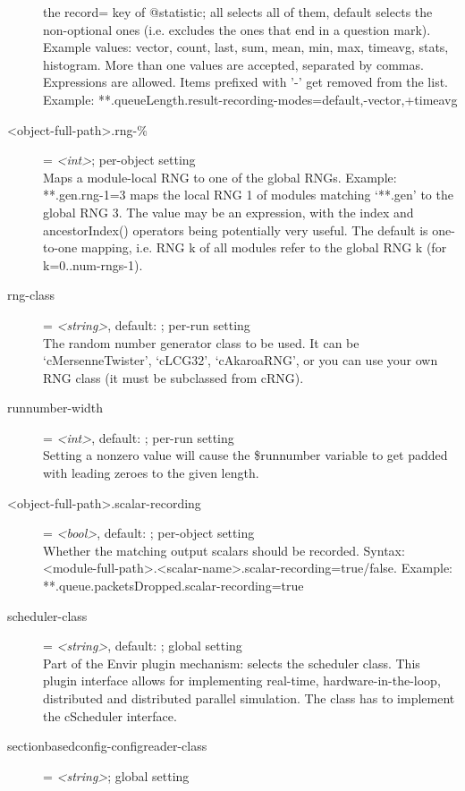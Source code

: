 \begin{description}
    the record= key of @statistic; all selects all of them, default selects the
    non-optional ones (i.e. excludes the ones that end in a question mark).
    Example values: vector, count, last, sum, mean, min, max, timeavg, stats,
    histogram. More than one values are accepted, separated by commas.
    Expressions are allowed. Items prefixed with '-' get removed from the list.
    Example: **.queueLength.result-recording-modes=default,-vector,+timeavg
\item[<object-full-path>.rng-\%] = \textit{<int>}; per-object setting \\
    Maps a module-local RNG to one of the global RNGs. Example: **.gen.rng-1=3
    maps the local RNG 1 of modules matching `**.gen' to the global RNG 3. The
    value may be an expression, with the index and ancestorIndex() operators
    being potentially very useful. The default is one-to-one mapping, i.e. RNG
    k of all modules refer to the global RNG k (for k=0..num-rngs-1).
\item[rng-class] = \textit{<string>}, default: ; per-run setting \\
    The random number generator class to be used. It can be `cMersenneTwister',
    `cLCG32', `cAkaroaRNG', or you can use your own RNG class (it must be
    subclassed from cRNG).
\item[runnumber-width] = \textit{<int>}, default: ; per-run setting \\
    Setting a nonzero value will cause the \$runnumber variable to get padded
    with leading zeroes to the given length.
\item[<object-full-path>.scalar-recording] = \textit{<bool>}, default: ; per-object setting \\
    Whether the matching output scalars should be recorded. Syntax:
    <module-full-path>.<scalar-name>.scalar-recording=true/false. Example:
    **.queue.packetsDropped.scalar-recording=true
\item[scheduler-class] = \textit{<string>}, default: ; global setting \\
    Part of the Envir plugin mechanism: selects the scheduler class. This
    plugin interface allows for implementing real-time, hardware-in-the-loop,
    distributed and distributed parallel simulation. The class has to implement
    the cScheduler interface.
\item[sectionbasedconfig-configreader-class] = \textit{<string>}; global setting \\

\end{description}
